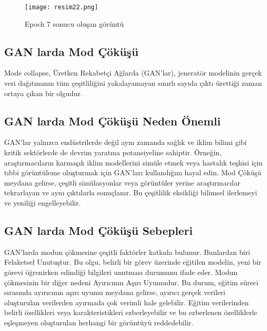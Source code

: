 \documentclass[10pt]{article}
\begin{document}
	\clearpage %
	
	\begin{figure}[htbp]
		\centering
		\texttt{[image: resim22.png]}
		\caption{Epoch 7 sonucu oluşan görüntü}
		\label{fig:uretici_tuketici}
	\end{figure}
	
	
	
	\subsection{GAN larda Mod Çöküşü}
	Mode collapse,  Üretken Rekabetçi Ağlarda (GAN'lar), jeneratör modelinin gerçek veri dağıtımının tüm çeşitliliğini yakalayamayan sınırlı sayıda çıktı ürettiği zaman ortaya çıkan bir olgudur\cite{gan_overfitting}.
	
	\subsection{GAN larda Mod Çöküşü Neden Önemli}
	GAN'lar yalnızca endüstrilerde değil aynı zamanda sağlık ve iklim bilimi gibi kritik sektörlerde de devrim yaratma potansiyeline sahiptir. Örneğin, araştırmacıların karmaşık iklim modellerini simüle etmek veya hastalık teşhisi için tıbbi görüntüleme oluşturmak için GAN'ları kullandığını hayal edin. Mod Çöküşü meydana gelirse, çeşitli simülasyonlar veya görüntüler yerine araştırmacılar tekrarlayan ve aynı çıktılarla sonuçlanır. Bu çeşitlilik eksikliği bilimsel ilerlemeyi ve yeniliği engelleyebilir\cite{gan_overfitting}.
	
	\subsection{GAN larda Mod Çöküşü Sebepleri}
	GAN'larda modun çökmesine çeşitli faktörler katkıda bulunur. Bunlardan biri Felaketsel Unutuştur. Bu olgu, belirli bir görev üzerinde eğitilen modelin, yeni bir görevi öğrenirken edindiği bilgileri unutması durumunu ifade eder. Modun çökmesinin bir diğer nedeni Ayırıcının Aşırı Uyumudur. Bu durum, eğitim süreci sırasında ayırıcının aşırı uyumu meydana gelirse, ayırıcı gerçek verileri oluşturulan verilerden ayırmada çok verimli hale gelebilir. Eğitim verilerinden belirli özellikleri veya karakteristikleri ezberleyebilir ve bu ezberlenen özelliklerle eşleşmeyen oluşturulan herhangi bir görüntüyü reddedebilir\cite{gan_overfitting}.
	
\end{document}

